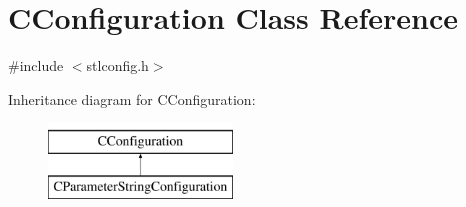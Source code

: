 \hypertarget{classCConfiguration}{\section{C\-Configuration Class Reference}
\label{classCConfiguration}
}


{\ttfamily \#include $<$stlconfig.\-h$>$}

Inheritance diagram for C\-Configuration\-:\begin{figure}[H]
\begin{center}
\leavevmode
\includegraphics[height=2.000000cm]{dc/d01/classCConfiguration}
\end{center}
\end{figure}

